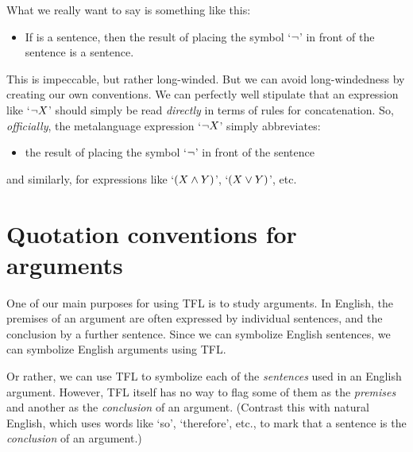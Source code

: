 What we really want to say is something like this:
\begin{itemize}
	\item[2$'''$.] If \metaX is a sentence, then the result of placing the symbol `$\neg$' in front of the sentence \metaX is a sentence.
\end{itemize}
This is impeccable, but rather long-winded. %
But we can avoid long-windedness by creating our own conventions. We can perfectly well stipulate that an expression like `$\neg X$' should simply be read \emph{directly} in terms of rules for concatenation. So, \emph{officially}, the metalanguage expression `$\neg X$'
simply abbreviates:
\begin{itemize}
	\item[]	the result of placing the symbol `$\neg$' in front of the sentence \metaX
\end{itemize}
and similarly, for expressions like `$(X \mathbin{\wedge} Y)$', `$(X \vee Y)$', etc.


\section{Quotation conventions for arguments}
One of our main purposes for using TFL is to study arguments. In English, the premises of an argument are often expressed by individual sentences, and the conclusion by a further sentence. Since we can symbolize English sentences, we can symbolize English arguments using TFL.

Or rather, we can use TFL to symbolize each of the \emph{sentences} used in an English argument. However, TFL itself has no way to flag some of them as the \emph{premises} and another as the \emph{conclusion} of an argument.  (Contrast this with natural English, which uses words like `so', `therefore', etc., to mark that a sentence is the \emph{conclusion} of an argument.)


